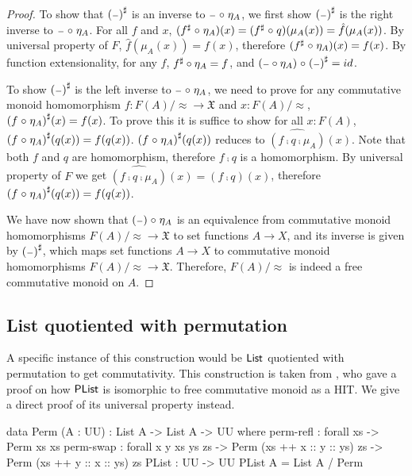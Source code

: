 \begin{proof}
    To show that ${({\scriptstyle{-}})}^{\sharp}$ is an inverse to ${\scriptstyle{-}} \mathrel{\circ} \eta_A$,
    we first show ${({\scriptstyle{-}})}^{\sharp}$ is the right inverse to ${\scriptstyle{-}} \mathrel{\circ} \eta_A$.
    For all $f$ and $x$, $({f}^{\sharp} \mathrel{\circ} \eta_A)(x) = ({f}^{\sharp} \mathrel{\circ} q)(\mu_A(x)) = \hat{f}(\mu_A(x))$.
    By universal property of $F$, $\hat{f}(\mu_A(x)) = f(x)$, therefore $({f}^{\sharp} \mathrel{\circ} \eta_A)(x) = f(x)$.
    By function extensionality, for any $f$, ${f}^{\sharp} \circ \eta_A = f$,
    and $({\scriptstyle{-}} \circ \eta_A) \mathrel{\circ} {({\scriptstyle{-}})}^{\sharp} = id$.

    To show ${({\scriptstyle{-}})}^{\sharp}$ is the left inverse to ${\scriptstyle{-}} \mathrel{\circ} \eta_A$, we need to prove
    for any commutative monoid homomorphism $f : F(A) / \approx \to \mathfrak{X}$ and $x : F(A) / \approx$,
    ${(f \mathrel{\circ} \eta_A)}^{\sharp}(x) = f(x)$. To prove this it is suffice to show for all $x : F(A)$,
    ${(f \mathrel{\circ} \eta_A)}^{\sharp}(q(x)) = f(q(x))$. 
    ${(f \mathrel{\circ} \eta_A)}^{\sharp}(q(x))$ reduces to $\widehat{(f \comp q \comp \mu_A)}(x)$.
    Note that both $f$ and $q$ are homomorphism, therefore $f \comp q$ is a homomorphism. By
    universal property of $F$ we get $\widehat{(f \comp q \comp \mu_A)}(x) = (f \comp q)(x)$,
    therefore ${(f \mathrel{\circ} \eta_A)}^{\sharp}(q(x)) = f(q(x))$.

    We have now shown that $({\scriptstyle{-}}) \mathrel{\circ} \eta_A$ is an equivalence from
    commutative monoid homomorphisms $F(A) / \approx \to \mathfrak{X}$
    to set functions $A \to X$, and its inverse is given by ${({\scriptstyle{-}})}^{\sharp}$, which maps set
    functions $A \to X$ to commutative monoid homomorphisms $F(A) / \approx \to \mathfrak{X}$.
    Therefore, $F(A) / \approx$ is indeed a free commutative monoid on $A$.
\end{proof}


\subsection{List quotiented with permutation}\label{cmon:plist}
A specific instance of this construction would be $\operatorname{\mathsf{List}}$ quotiented with permutation to get commutativity.
This construction is taken from \cite{joramConstructiveFinalSemantics2023}, who gave a proof on how
$\operatorname{\mathsf{PList}}$ is isomorphic to free commutative monoid as a HIT. We give a direct proof of its universal
property instead.

\begin{code}
data Perm (A : UU) : List A -> List A -> UU where
  perm-refl : forall {xs} -> Perm xs xs
  perm-swap : forall {x y xs ys zs} -> Perm (xs ++ x :: y :: ys) zs
                               -> Perm (xs ++ y :: x :: ys) zs 
PList : UU -> UU
PList A = List A / Perm
\end{code}


